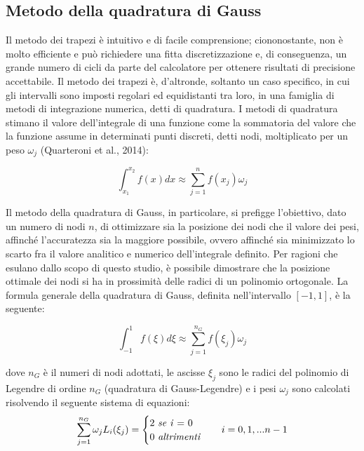 \documentclass[12pt]{article} %
\begin{document}
\subsection{Metodo della quadratura di Gauss}

\noindent Il metodo dei trapezi è intuitivo e di facile comprensione; ciononostante, non è molto efficiente e può richiedere una fitta discretizzazione e, di conseguenza, un grande numero di cicli da parte del calcolatore per ottenere risultati di precisione accettabile. 
Il metodo dei trapezi è, d’altronde, soltanto un caso specifico, in cui gli intervalli sono imposti regolari ed equidistanti tra loro, in una famiglia di metodi di integrazione numerica, detti di quadratura. I metodi di quadratura stimano il valore dell’integrale di una funzione come la sommatoria del valore che la funzione assume in determinati punti discreti, detti nodi, moltiplicato per un peso $\omega_{j}$ (Quarteroni et al., 2014):

\begin{equation}
    \int_{x_1}^{x_2} f(x)dx\approx\sum_{j=1}^n f(x_j)\omega_j
    \label{eqn:formule_quadratura}
\end{equation}

\noindent Il metodo della quadratura di Gauss, in particolare, si prefigge l’obiettivo, dato un numero di nodi $n$, di ottimizzare sia la posizione dei nodi che il valore dei pesi, affinché l’accuratezza sia la maggiore possibile, ovvero affinché sia minimizzato lo scarto fra il valore analitico e numerico dell’integrale definito. Per ragioni che esulano dallo scopo di questo studio, è possibile dimostrare che la posizione ottimale dei nodi si ha in prossimità delle radici di un polinomio ortogonale. 
La formula generale della quadratura di Gauss, definita nell’intervallo $[-1,1]$, è la seguente:

\begin{equation}
    \int_{-1}^{1} f(\xi)d\xi\approx\sum_{j=1}^{n_G} f(\xi_{j})\omega_{j}
    \label{eqn:Gauss-Legendre_1}
\end{equation}

\noindent dove $n_G$ è il numeri di nodi adottati, le ascisse $\xi_{j}$ sono le radici del polinomio di Legendre di ordine $n_G$ (quadratura di Gauss-Legendre) e i pesi $\omega_j$ sono calcolati risolvendo il seguente sistema di equazioni:
\begin{align}
    \sum_{j=1}^{n_G} \omega_j L_i(\xi_j) = \begin{cases}\textrm{2 \textit{se i} = 0}\\\textrm{0 \textit{altrimenti}}\end{cases} && i = 0, 1, ... n-1
    \label{eqn:pesi_Gauss-Legendre_1}
\end{align}
\end{document}

